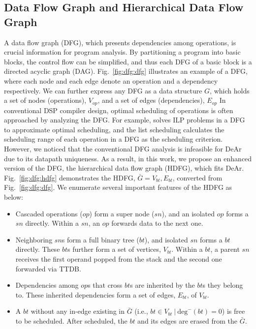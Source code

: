\subsection{Data Flow Graph and Hierarchical Data Flow Graph}
\label{sec:hdfg}
A data flow graph (DFG), which presents dependencies among operations, is crucial information for program analysis.
By partitioning a program into basic blocks, the control flow can be simplified, and thus each DFG of a basic block is a directed acyclic graph (DAG).
Fig.~\ref{fig:dfg:dfg} illustrates an example of a DFG, where each node and each edge denote an operation and a dependency respectively.
We can further express any DFG as a data structure $G$, which holds a set of nodes (operations), $V_{op}$, and a set of edges (dependencies), $E_{op}$
In conventional DSP compiler design, optimal scheduling of operations is often approached by analyzing the DFG.
For example, \cite{dsplite} solves ILP problems \cite{ilp} in a DFG to approximate optimal scheduling, 
and the list scheduling \cite{list} calculates the scheduling range of each operation in a DFG as the scheduling criterion. 
\\\indent
However, we noticed that the conventional DFG analysis is infeasible for DeAr due to its datapath uniqueness.
As a result, in this work, we propose an enhanced version of the DFG, the hierarchical data flow graph (HDFG), which fits DeAr.
Fig.~\ref{fig:dfg:hdfg} demonstrates the HDFG, $\bar{G} = {V_{bt}, E_{bt}}$, converted from Fig.~\ref{fig:dfg:dfg}.
We enumerate several important features of the HDFG as below: 
\begin{itemize}
    \item Cascaded operations ($op$) form a super node ($sn$), and an isolated $op$ forms a $sn$ directly. 
Within a $sn$, an $op$ forwards data to the next one.
    \item Neighboring $sn$s form a full binary tree ($bt$), and isolated $sn$ forms a $bt$ directly.
These $bt$s further form a set of vertices, $V_{bt}$.
Within a $bt$, a parent $sn$ receives the first operand popped from the stack and the second one forwarded via TTDB.
    \item Dependencies among $op$s that cross $bt$s are inherited by the $bt$s they belong to.
These inherited dependencies form a set of edges, $E_{bt}$, of $V_{bt}$.
    \item A $bt$ without any in-edge existing in $\bar{G}$ (i.e., $bt \in V_{bt}\ |\ \textrm{deg}^-(bt) = 0$) is free to be scheduled. 
After scheduled, the $bt$ and its edges are erased from the $\bar{G}$.%
\end{itemize}

